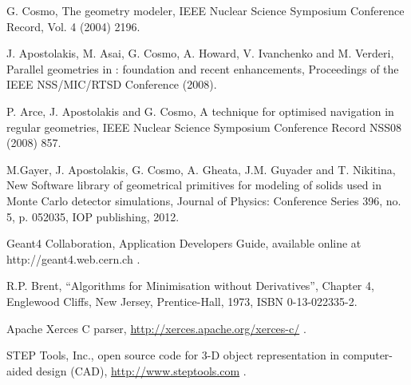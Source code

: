 
 G. Cosmo, The \Gfour geometry modeler,
         IEEE Nuclear Science Symposium Conference Record, Vol. 4 (2004) 2196.

 J. Apostolakis, M. Asai, G. Cosmo, A. Howard,
                              V. Ivanchenko and M. Verderi, Parallel geometries in
                              \Gfour: foundation and recent enhancements, 
                              Proceedings of the IEEE NSS/MIC/RTSD Conference (2008). 

 P. Arce, J. Apostolakis and G. Cosmo, A technique for
                             optimised navigation in regular geometries,
                             IEEE Nuclear Science Symposium Conference Record 
                             NSS08 (2008) 857.
                

 M.Gayer, J. Apostolakis, G. Cosmo, A. Gheata, J.M. Guyader and
                              T. Nikitina, New Software library of geometrical primitives for
                              modeling of solids used in Monte Carlo detector simulations,
                              Journal of Physics: Conference Series 396, no. 5, p. 052035,
                              IOP publishing, 2012.

 Geant4 Collaboration, Application Developers Guide,
                          available online at http://geant4.web.cern.ch .

 R.P. Brent, ``Algorithms for Minimisation without Derivatives'',
                            Chapter 4, Englewood Cliffs, New Jersey, Prentice-Hall, 1973,
                            ISBN 0-13-022335-2.

 Apache Xerces C parser,
                              \url{http://xerces.apache.org/xerces-c/} .

 STEP Tools, Inc., open source code for 3-D object
                                representation in computer-aided design (CAD),
                                \url{http://www.steptools.com} .

